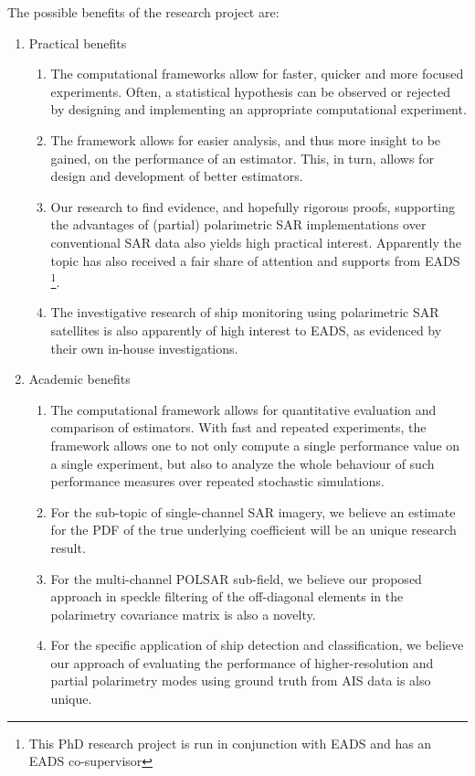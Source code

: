 The possible benefits of the research project are:
\begin{enumerate}
\item Practical benefits
\begin{enumerate}
\item The computational frameworks allow for faster, quicker and more focused experiments. 
Often, a statistical hypothesis can be observed or rejected by designing and implementing an appropriate computational experiment.
\item The framework allows for easier analysis, and thus more insight to be gained, on the performance of an estimator. 
This, in turn, allows for design and development of better estimators.
\item Our research to find evidence, and hopefully rigorous proofs, supporting the advantages of (partial) polarimetric SAR implementations over conventional SAR data also yields high practical interest.
Apparently the topic has also received a fair share of attention and supports from EADS \footnote{This PhD research project is run in conjunction with EADS and has an EADS co-supervisor}.
\item The investigative research of ship monitoring using polarimetric SAR satellites is also apparently of high interest to EADS, as evidenced by their own in-house investigations.
\end{enumerate}
\item Academic benefits
\begin{enumerate}
\item The computational framework allows for quantitative evaluation and comparison of estimators.
With fast and repeated experiments, the framework allows one to not only compute a single performance value on a single experiment, but also to analyze the whole behaviour of such performance measures over repeated stochastic simulations.
\item For the sub-topic of single-channel SAR imagery, we believe an estimate for the PDF of the true underlying coefficient will be an unique research result.%
\item For the multi-channel POLSAR sub-field, we believe our proposed approach in speckle filtering of the off-diagonal elements in the polarimetry covariance matrix is also a novelty.
\item For the specific application of ship detection and classification, we believe our approach of evaluating the performance of higher-resolution and partial polarimetry modes using ground truth from AIS data is also unique.
\end{enumerate}
\end{enumerate}

